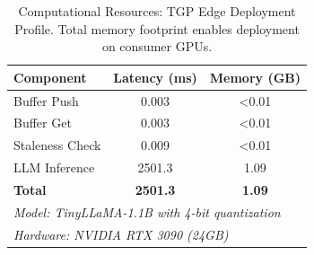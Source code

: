 
\begin{table}[t]
\centering
\caption{Computational Resources: TGP Edge Deployment Profile.
Total memory footprint enables deployment on consumer GPUs.}
\label{tab:computational_cost}
\begin{tabular}{l c c}
\toprule
\textbf{Component} & \textbf{Latency (ms)} & \textbf{Memory (GB)} \\
\midrule
Buffer Push & 0.003 & <0.01 \\
Buffer Get & 0.003 & <0.01 \\
Staleness Check & 0.009 & <0.01 \\
LLM Inference & 2501.3 & 1.09 \\
\midrule
\textbf{Total} & \textbf{2501.3} & \textbf{1.09} \\

\midrule
\multicolumn{3}{l}{\textit{Model: TinyLLaMA-1.1B with 4-bit quantization}} \\
\multicolumn{3}{l}{\textit{Hardware: NVIDIA RTX 3090 (24GB)}} \\
\bottomrule
\end{tabular}
\end{table}
